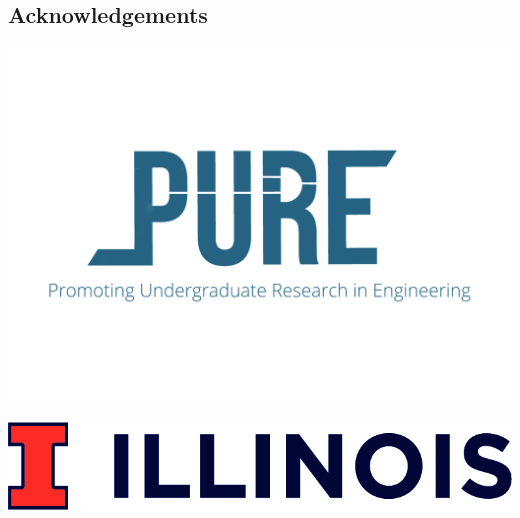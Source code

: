 \documentclass{a0poster}
\begin{document}
\begin{multicols}{3}
\vspace{-1.5cm}
\section{Acknowledgements}
\vspace{-1.5cm}
\begin{minipage}[c]{0.5\linewidth}
\begin{centering}
\includegraphics[width=0.75\linewidth]{pure_logof.pdf}
\end{centering}
\end{minipage}
\begin{minipage}[c]{0.5\linewidth}
\begin{centering}
\includegraphics[width=0.75\linewidth]{logo.jpg}
\end{centering}
\end{minipage}

\end{multicols}
\end{document}
